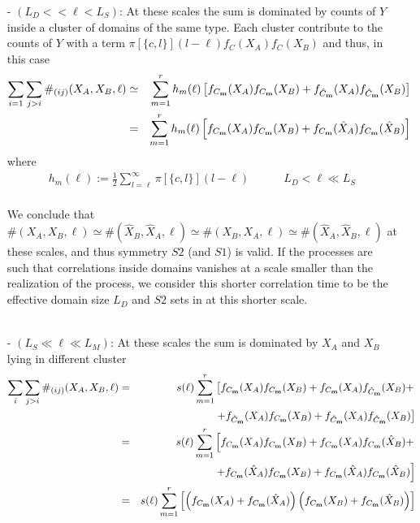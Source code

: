 \documentclass[fleqn,10pt]{wlscirep}
\def\sm{\textbf{\tiny m}}
\begin{document}
\begin{itemize}
\item[-] \textbf{$( L_D < <\ell < L_S)$}:
At these scales the sum is dominated by counts of  $Y$ inside a  cluster of  domains  of the same type. Each cluster contribute to the counts of $Y$ with a term $\pi[\{c,l\}] (l-\ell) f_C(X_A)f_{C}(X_B)$ 
and thus, in this case
\begin{eqnarray}
\sum_{i=1}\sum_{j>i}{\#_{(ij)}(X_A,X_B,\ell)}
 &\simeq &  \sum_{m=1}^r h_m(\ell) \left[ f_{C_\sm}(X_A) f_{C_\sm}(X_B)  +  f_{\hat{C}_\sm}(X_A)f_{\hat{C}_\sm}(X_B) \right]\nonumber \\ 
&=&\sum_{m=1}^{r} h_m(\ell)   \left[ f_{C_\sm}(X_A) f_{C_\sm}(X_B)  +   f_{C_\sm}(\hat{X}_A)f_{C_\sm}(\hat{X}_B) \right] \nonumber
\end{eqnarray}
where 
\begin{eqnarray}
h_m(\ell):=\frac12\sum_{l=\ell}^{\infty} \pi[\{c,l\}]  (l-\ell) \quad \quad \quad L_D < \ell \ll L_S \nonumber
\end{eqnarray} 
\\
We conclude that  $\#(X_A,X_B,\ell) \simeq \#(\hat{X}_B,\hat{X}_A,\ell)\simeq \#(X_B,X_A,\ell) \simeq \#(\hat{X}_A,\hat{X}_B,\ell)$ at these scales, 
and thus symmetry $S2$ (and $S1$) is valid. If the processes are such that correlations inside domains vanishes at a scale smaller than the realization of the process, we consider this shorter correlation time to be the effective domain size $L_D$ and $S2$ sets in at this shorter scale.
\\
\\
\item[-]$( L_S \ll \ell \ll L_M)$: At these scales the sum is dominated by $X_A$ and $X_B$ lying in different cluster
\begin{eqnarray}
\sum_{i}\sum_{j>i}{\#_{(ij)}(X_A,X_B,\ell)}
  &= &  s(\ell) \sum_{m=1}^r  \left[ f_{C_\sm}(X_A) f_{C_\sm}(X_B)+f_{C_\sm}(X_A) f_{\hat{C}_\sm}({X}_B) + \right. \nonumber\\
  && \left. \quad \quad \quad \quad \quad+ f_{\hat{C}_\sm}({X}_A) f_{C_\sm}(X_B) + f_{\hat{C}_\sm}({X}_A)f_{\hat{C}_\sm}({X}_B) \right]\nonumber\\
  &= &  s(\ell) \sum_{m=1}^r  \left[ f_{C_\sm}(X_A) f_{C_\sm}(X_B)+f_{C_\sm}(X_A) f_{{C}_\sm}(\hat{X}_B)+\right. \nonumber\\
  && \left. \quad \quad \quad \quad \quad+  f_{{C}_\sm}(\hat{X}_A) f_{C_\sm}(X_B) + f_{{C}_\sm}(\hat{X}_A)f_{{C}_\sm}(\hat{X}_B) \right]\nonumber\\
   &= &  s(\ell) \sum_{m=1}^r  \left[ \left( f_{C_\sm}(X_A)+  f_{{C}_\sm}(\hat{X}_A) \right) \left(f_{C_\sm}(X_B)+ f_{{C}_\sm}(\hat{X}_B) \right)\right]\nonumber\\

\end{eqnarray}
\end{itemize}
\end{document}
